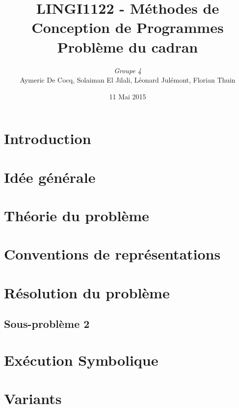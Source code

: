 \documentclass[11pt,a4paper]{article}
\author{\textit{Groupe 4}\\
Aymeric De Cocq, Solaiman El Jilali, Léonard Julémont, Florian Thuin}
\title{LINGI1122 - Méthodes de Conception de Programmes\\
Problème du cadran}
\date{11 Mai 2015}
\begin{document}
\maketitle

\section* {Introduction}


\section{Idée générale}


 
\section{Théorie du problème}


\section{Conventions de représentations}


\section{Résolution du problème}





\subsection{Sous-problème 2}

\section{Exécution Symbolique}

\section{Variants}
\end{document}
